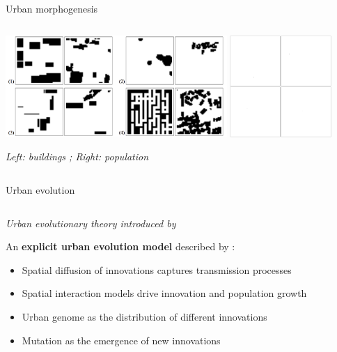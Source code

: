 \documentclass{beamer}
\begin{document}
\begin{frame}{}
\begin{columns}[t]
\begin{column}{.49\textwidth}
\begin{block}{Urban morphogenesis}
\begin{columns}[t]
\begin{column}{.95\textwidth}
          
		
		
		\begin{center}
		
		\includegraphics[width=0.63\textwidth]{figures/spatialsens_calib.png}
		\hspace{0.5cm}
		\includegraphics[width=0.29\textwidth]{figures/mesobench_Fig3.png}
		
		\end{center}
		
		{\small\textit{Left: buildings \cite{raimbault2019generating}; Right: population \cite{raimbault2020comparison}}}
		
          \end{column}
          \end{columns}
        \end{block}
        
        
         \begin{block}{Urban evolution}
       \vspace{-2cm}
        \begin{columns}[t]
        \begin{column}{.95\textwidth}
        
        \vspace{0.5cm}
        
        \textit{Urban evolutionary theory introduced by \cite{pumain1997pour}}
        
        
  		\vspace{1cm}
        
        An \textbf{explicit urban evolution model} described by \cite{raimbault2020model}:
		\begin{itemize}
			\item Spatial diffusion of innovations captures transmission processes
			\item Spatial interaction models drive innovation and population growth
			\item Urban genome as the distribution of different innovations
			\item Mutation as the emergence of new innovations
		\end{itemize}


\end{column}
\end{columns}
\end{block}
\end{column}
\end{columns}
\end{frame}
\end{document}
